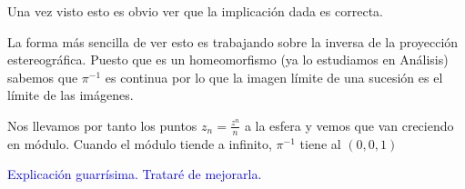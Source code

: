 \begin{problem}[1]
Una vez visto esto es obvio ver que la implicación dada es correcta.

\spart

La forma más sencilla de ver esto es trabajando sobre la inversa de la proyección estereográfica. Puesto que es un homeomorfismo (ya lo estudiamos en Análisis) sabemos que $π^{-1}$ es continua por lo que la imagen límite de una sucesión es el límite de las imágenes.

Nos llevamos por tanto los puntos $z_n=\frac{z^n}{n}$ a la esfera y vemos que van creciendo en módulo. Cuando el módulo tiende a infinito, $π^{-1}$ tiene al $(0,0,1)$

\textcolor{blue}{Explicación guarrísima. Trataré de mejorarla.}

\end{problem}

